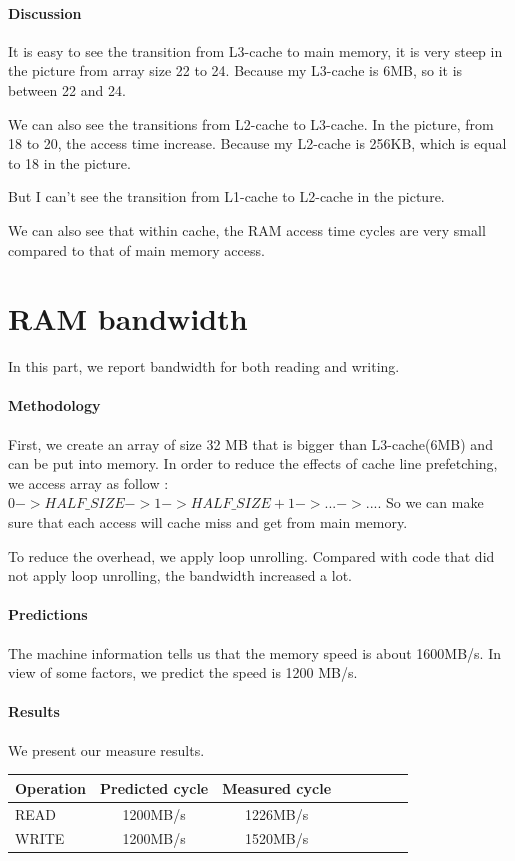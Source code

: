 \paragraph{Discussion}
It is easy to see the transition from L3-cache to main memory, it is very steep in the picture from array size 22 to 24. Because my L3-cache is 6MB, so it is between 22 and 24.

We can also see the transitions from L2-cache to L3-cache. In the picture, from 18 to 20, the access time increase. Because my L2-cache is 256KB, which is equal to 18 in the picture.

But I can't see the transition from L1-cache to L2-cache in the picture.

We can also see that within cache, the RAM access time cycles are very small compared to that of main memory access.

\section{RAM bandwidth}
In this part, we report bandwidth for both reading and writing.

\paragraph{Methodology}
First, we create an array of size 32 MB that is bigger than L3-cache(6MB) and can be put into memory. In order to reduce the effects of cache line prefetching, we access array as follow : $0 -> HALF\_SIZE -> 1 -> HALF\_SIZE+1 -> ... -> ...$. So we can make sure that each access will cache miss and get from main memory.

To reduce the overhead, we apply loop unrolling. Compared with code that did not apply loop unrolling, the bandwidth increased  a lot.

\paragraph{Predictions}
The machine information tells us that the memory speed is about 1600MB/s. In view of some factors, we predict the speed is 1200 MB/s.

\paragraph{Results}
We present our measure results.

\begin{center}
\begin{tabular}{l*{6}{c}r}
Operation             & Predicted cycle & Measured cycle  \\
\hline
READ & 1200MB/s & 1226MB/s \\
WRITE & 1200MB/s & 1520MB/s \\

\end{tabular}
\end{center}

